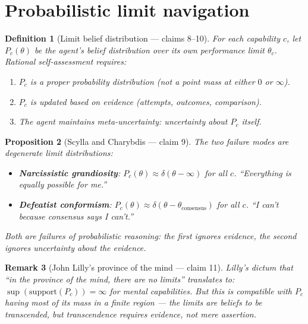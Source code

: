 \documentclass[11pt,a4paper]{article}
\newtheorem{definition}{Definition}[section]
\newtheorem{proposition}[definition]{Proposition}
\newtheorem{remark}[definition]{Remark}
\begin{document}
\section{Probabilistic limit navigation}
\label{sec:limits}

\begin{definition}[Limit belief distribution --- claims 8--10]
\label{def:limit-dist}
For each capability $c$, let $P_c(\theta)$ be the agent's belief distribution
over its own performance limit $\theta_c$. Rational self-assessment requires:
\begin{enumerate}
\item $P_c$ is a proper probability distribution (not a point mass at
  either $0$ or $\infty$).
\item $P_c$ is updated based on evidence (attempts, outcomes, comparison).
\item The agent maintains meta-uncertainty: uncertainty about $P_c$ itself.
\end{enumerate}
\end{definition}

\begin{proposition}[Scylla and Charybdis --- claim 9]
\label{prop:scylla}
The two failure modes are degenerate limit distributions:
\begin{itemize}
\item \textbf{Narcissistic grandiosity}: $P_c(\theta) \approx \delta(\theta - \infty)$
  for all $c$. ``Everything is equally possible for me.''
\item \textbf{Defeatist conformism}: $P_c(\theta) \approx \delta(\theta - \theta_{\text{consensus}})$
  for all $c$. ``I can't because consensus says I can't.''
\end{itemize}
Both are failures of probabilistic reasoning: the first ignores evidence,
the second ignores uncertainty about the evidence.
\end{proposition}

\begin{remark}[John Lilly's province of the mind --- claim 11]
Lilly's dictum that ``in the province of the mind, there are no limits''
translates to: $\sup(\text{support}(P_c)) = \infty$ for mental capabilities.
But this is compatible with $P_c$ having most of its mass in a finite region
--- the limits are beliefs to be transcended, but transcendence requires
evidence, not mere assertion.
\end{remark}
\end{document}
